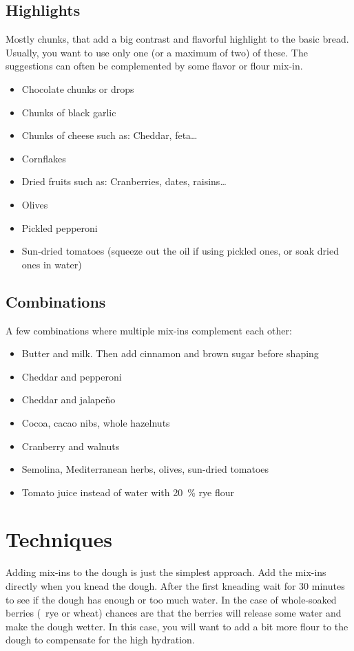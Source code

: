 \subsection{Highlights}
Mostly chunks, that add a big contrast and flavorful highlight to the basic
bread. Usually, you want to use only one (or a maximum of two) of these. The suggestions
can often be complemented by some flavor or flour mix-in.

\begin{itemize}
  \item Chocolate chunks or drops
  \item Chunks of black garlic
  \item Chunks of cheese such as: Cheddar, feta\dots{}
  \item Cornflakes
  \item Dried fruits such as: Cranberries, dates, raisins\dots{}
  \item Olives
  \item Pickled pepperoni
  \item Sun-dried tomatoes (squeeze out the oil if using pickled ones, or soak
      dried ones in water)
\end{itemize}

\subsection{Combinations}
A few combinations where multiple mix-ins complement each other:

\begin{itemize}
  \item Butter and milk. Then add cinnamon and brown sugar before shaping
  \item Cheddar and pepperoni
  \item Cheddar and jalapeño
  \item Cocoa, cacao nibs, whole hazelnuts
  \item Cranberry and walnuts
  \item Semolina, Mediterranean herbs, olives, sun-dried tomatoes
  \item Tomato juice instead of water with \qty{20}{\percent} rye flour
\end{itemize}

\section{Techniques}

Adding mix-ins to the dough is just the simplest approach. Add the mix-ins
directly when you knead the dough. After the first kneading wait for 30
minutes to see if the dough has enough or too much water. In the case of
whole-soaked berries (\eg~rye or wheat) chances are that the berries will
release some water and make the dough wetter. In this case, you will want to
add a bit more flour to the dough to compensate for the high hydration.

